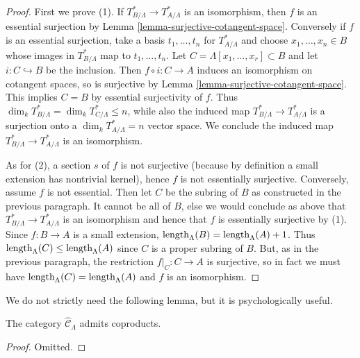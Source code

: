 \begin{proof}
First we prove (1). If $T^*_{B/\Lambda} \rightarrow T^*_{A/\Lambda}$ is an 
isomorphism, then $f$ is an essential surjection by Lemma 
\ref{lemma-surjective-cotangent-space}.  Conversely if $f$ is an essential 
surjection, take a basis $t_1, \dots, t_n$ for $T^*_{A/\Lambda}$ and choose 
$x_1, \dots, x_n \in B$ whose images in $T^*_{B/\Lambda}$ map to $t_1, \dots, 
t_n$. Let $C = \Lambda[x_1, \dots, x_r] \subset B$ and let $i: C 
\hookrightarrow B$ be the inclusion. Then $f \circ i: C \rightarrow A$ induces 
an isomorphism on cotangent spaces, so is surjective by Lemma 
\ref{lemma-surjective-cotangent-space}. This implies $C = B$ by essential 
surjectivity of $f$. Thus $\dim_{k} T^*_{B/\Lambda} = \dim_{k} T^*_{C/\Lambda} 
\leq n$, while also the induced map $T^*_{B/\Lambda} \rightarrow 
T^*_{A/\Lambda}$ is a surjection onto a $\dim_k T^*_{A/\Lambda} = n$ vector 
space.  We conclude the induced map $T^*_{B/\Lambda} \rightarrow 
T^*_{A/\Lambda}$ is an isomorphism.

\medskip \noindent
As for (2), a section $s$ of $f$ is not surjective (because by definition a 
small extension has nontrivial kernel), hence $f$ is not essentially 
surjective.  Conversely, assume $f$ is not essential.  Then let $C$ be the 
subring of $B$ as constructed in the previous paragraph.  It cannot be all of 
$B$, else we would conclude as above that $T^*_{B/\Lambda} \rightarrow 
T^*_{A/\Lambda}$ is an isomorphism and hence that $f$ is essentially surjective 
by (1).  Since $f: B \rightarrow A$ is a small extension, 
$\textnormal{length}_{\Lambda}(B) = \textnormal{length}_{\Lambda}(A) + 1$. Thus 
$\textnormal{length}_{\Lambda}(C) \leq \textnormal{length}_{\Lambda}(A)$ since 
$C$ is a proper subring of $B$.  But, as in the previous paragraph, the 
restriction $f|_{C}: C \rightarrow A$ is surjective, so in fact we must have 
$\textnormal{length}_{\Lambda}(C) = \textnormal{length}_{\Lambda}(A)$ and $f$ 
is an isomorphism.
\end{proof}

\noindent
We do not strictly need the following lemma, but it is psychologically useful.

\begin{lemma}
\label{lemma-CLambdahat-coproducts}
The category $\widehat{\mathcal C}_{\Lambda}$ admits coproducts.
\end{lemma}

\begin{proof}
Omitted.
\end{proof}

